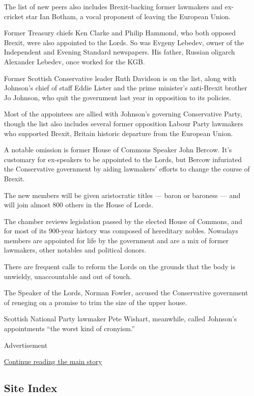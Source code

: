 The list of new peers also includes Brexit-backing former lawmakers and
ex-cricket star Ian Botham, a vocal proponent of leaving the European
Union.

Former Treasury chiefs Ken Clarke and Philip Hammond, who both opposed
Brexit, were also appointed to the Lords. So was Evgeny Lebedev, owner
of the Independent and Evening Standard newspapers. His father, Russian
oligarch Alexander Lebedev, once worked for the KGB.

Former Scottish Conservative leader Ruth Davidson is on the list, along
with Johnson's chief of staff Eddie Lister and the prime minister's
anti-Brexit brother Jo Johnson, who quit the government last year in
opposition to its policies.

Most of the appointees are allied with Johnson's governing Conservative
Party, though the list also includes several former opposition Labour
Party lawmakers who supported Brexit, Britain historic departure from
the European Union.

A notable omission is former House of Commons Speaker John Bercow. It's
customary for ex-speakers to be appointed to the Lords, but Bercow
infuriated the Conservative government by aiding lawmakers' efforts to
change the course of Brexit.

The new members will be given aristocratic titles --- baron or baroness
--- and will join almost 800 others in the House of Lords.

The chamber reviews legislation passed by the elected House of Commons,
and for most of its 900-year history was composed of hereditary nobles.
Nowadays members are appointed for life by the government and are a mix
of former lawmakers, other notables and political donors.

There are frequent calls to reform the Lords on the grounds that the
body is unwieldy, unaccountable and out of touch.

The Speaker of the Lords, Norman Fowler, accused the Conservative
government of reneging on a promise to trim the size of the upper house.

Scottish National Party lawmaker Pete Wishart, meanwhile, called
Johnson's appointments ``the worst kind of cronyism.''

Advertisement

\protect\hyperlink{after-bottom}{Continue reading the main story}

\hypertarget{site-index}{%
\subsection{Site Index}\label{site-index}}

